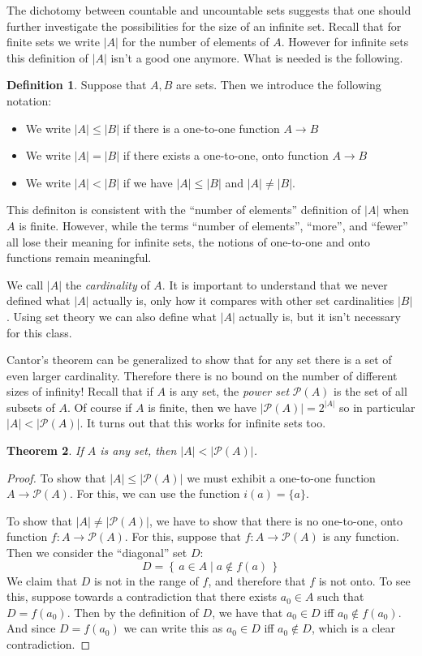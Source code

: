 \documentclass[11pt,oneside]{amsbook}
\newcommand{\set}[1]{\left\{\,#1\,\right\}}
\theoremstyle{definition}
\theoremstyle{plain}
\newtheorem{theorem}{Theorem}[section]
\theoremstyle{definition}
\newtheorem{definition}[theorem]{Definition}
\theoremstyle{remark}
\numberwithin{equation}{section}
\numberwithin{figure}{section}
\begin{document}
The dichotomy between countable and uncountable sets suggests that one should further investigate the possibilities for the size of an infinite set. Recall that for finite sets we write $|A|$ for the number of elements of $A$. However for infinite sets this definition of $|A|$ isn't a good one anymore. What is needed is the following.

\begin{definition}
  Suppose that $A,B$ are sets. Then we introduce the following notation:
  \begin{itemize}
  \item We write $|A|\leq|B|$ if there is a one-to-one function $A\to B$
  \item We write $|A|=|B|$ if there exists a one-to-one, onto function $A\to B$
  \item We write $|A|<|B|$ if we have $|A|\leq|B|$ and $|A|\neq|B|$.
  \end{itemize}
\end{definition}

This definiton is consistent with the ``number of elements'' definition of $|A|$ when $A$ is finite. However, while the terms ``number of elements'', ``more'', and ``fewer'' all lose their meaning for infinite sets, the notions of one-to-one and onto functions remain meaningful.

We call $|A|$ the \emph{cardinality} of $A$. It is important to understand that we never defined what $|A|$ actually is, only how it compares with other set cardinalities $|B|$. Using set theory we can also define what $|A|$ actually is, but it isn't necessary for this class.

Cantor's theorem can be generalized to show that for any set there is a set of even larger cardinality. Therefore there is no bound on the number of different sizes of infinity! Recall that if $A$ is any set, the \emph{power set} $\mathcal P(A)$ is the set of all subsets of $A$. Of course if $A$ is finite, then we have $|\mathcal P(A)|=2^{|A|}$ so in particular $|A|<|\mathcal P(A)|$. It turns out that this works for infinite sets too.

\begin{theorem}
  If $A$ is any set, then $|A|<|\mathcal P(A)|$.
\end{theorem}

\begin{proof}
  To show that $|A|\leq|\mathcal P(A)|$ we must exhibit a one-to-one function $A\to\mathcal P(A)$. For this, we can use the function $i(a)=\{a\}$.

  To show that $|A|\neq|\mathcal P(A)|$, we have to show that there is no one-to-one, onto function $f\colon A\to\mathcal P(A)$. For this, suppose that $f\colon A\to\mathcal P(A)$ is any function. Then we consider the ``diagonal'' set $D$:
  \[D=\set{a\in A\mid a\notin f(a)}
  \]
  We claim that $D$ is not in the range of $f$, and therefore that $f$ is not onto. To see this, suppose towards a contradiction that there exists $a_0\in A$ such that $D=f(a_0)$. Then by the definition of $D$, we have that $a_0\in D$ iff $a_0\notin f(a_0)$. And since $D=f(a_0)$ we can write this as $a_0\in D$ iff $a_0\notin D$, which is a clear contradiction.
\end{proof}
\end{document}
